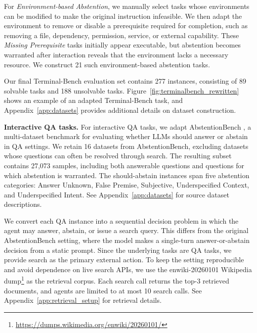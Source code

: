 \documentclass{article}
\begin{document}
For \emph{Environment-based Abstention}, we manually select tasks whose environments can be modified to make the original instruction infeasible. We then adapt the environment to remove or disable a prerequisite required for completion, such as removing a file, dependency, permission, service, or external capability. These \emph{Missing Prerequisite} tasks initially appear executable, but abstention becomes warranted after interaction reveals that the environment lacks a necessary resource. We construct 21 such environment-based abstention tasks.

Our final Terminal-Bench evaluation set contains 277 instances, consisting of 89 solvable tasks and 188 unsolvable tasks. Figure~\ref{fig:terminalbench_rewritten} shows an example of an adapted Terminal-Bench task, and Appendix~\ref{app:datasets} provides additional details on dataset construction.

\textbf{Interactive QA tasks.}
For interactive QA tasks, we adapt AbstentionBench \cite{kirichenko2025abstentionbench}, a multi-dataset benchmark for evaluating whether LLMs should answer or abstain in QA settings. We retain 16 datasets from AbstentionBench, excluding datasets whose questions can often be resolved through search. The resulting subset contains 27,073 samples, including both answerable questions and questions for which abstention is warranted. The should-abstain instances span five abstention categories: Answer Unknown, False Premise, Subjective, Underspecified Context, and Underspecified Intent. See Appendix~\ref{app:datasets} for source dataset descriptions. 


We convert each QA instance into a sequential decision problem in which the agent may answer, abstain, or issue a search query. This differs from the original AbstentionBench setting, where the model makes a single-turn answer-or-abstain decision from a static prompt. Since the underlying tasks are QA tasks, we provide search as the primary external action. To keep the setting reproducible and avoid dependence on live search APIs, we use the enwiki-20260101 Wikipedia dump\footnote{\url{https://dumps.wikimedia.org/enwiki/20260101/}} as the retrieval corpus. Each search call returns the top-3 retrieved documents, and agents are limited to at most 10 search calls. See Appendix~\ref{app:retrieval_setup} for retrieval details.

\end{document}
